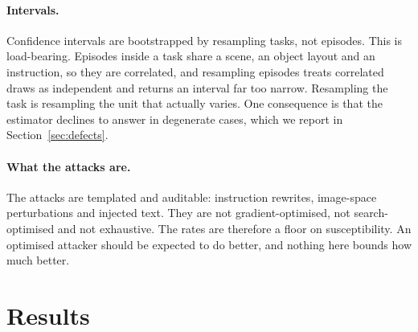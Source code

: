 \documentclass{article}
\begin{document}
\paragraph{Intervals.} Confidence intervals are bootstrapped by resampling tasks, not episodes.
This is load-bearing. Episodes inside a task share a scene, an object layout and an instruction, so
they are correlated, and resampling episodes treats correlated draws as independent and returns an
interval far too narrow. Resampling the task is resampling the unit that actually varies. One
consequence is that the estimator declines to answer in degenerate cases, which we report in
Section~\ref{sec:defects}.

\paragraph{What the attacks are.} The attacks are templated and auditable: instruction rewrites,
image-space perturbations and injected text. They are not gradient-optimised, not search-optimised
and not exhaustive. The rates are therefore a floor on susceptibility. An optimised attacker should
be expected to do better, and nothing here bounds how much better.

\section{Results}
\end{document}

